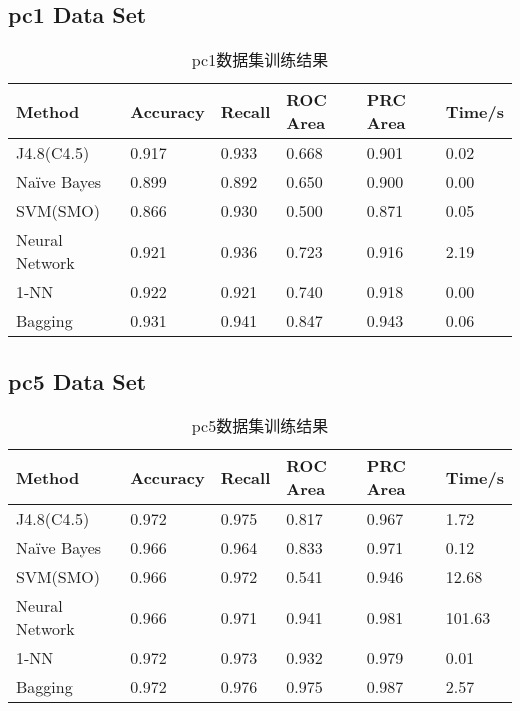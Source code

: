 \documentclass[a4paper,UTF8]{article}
\numberwithin{equation}{section}
\begin{document}
\subsection{pc1 Data Set}
\begin{table}[H]
\centering
\caption{pc1数据集训练结果}
\label{my-label}
\begin{tabular}{l|lllll}
\hline
Method         & Accuracy & Recall & ROC Area & PRC Area & Time/s \\ \hline
J4.8(C4.5)     & 0.917    & 0.933  & 0.668    & 0.901    & 0.02   \\ \hline
Naïve Bayes   & 0.899    & 0.892  & 0.650    & 0.900    & 0.00   \\ \hline
SVM(SMO)       & 0.866    & 0.930  & 0.500    & 0.871    & 0.05   \\ \hline
Neural Network & 0.921    & 0.936  & 0.723    & 0.916    & 2.19   \\ \hline
1-NN           & 0.922    & 0.921  & 0.740    & 0.918    & 0.00   \\ \hline
Bagging        & 0.931    & 0.941  & 0.847    & 0.943    & 0.06   \\ \hline
\end{tabular}
\end{table}

\subsection{pc5 Data Set}
\begin{table}[H]
\centering
\caption{pc5数据集训练结果}
\label{my-label}
\begin{tabular}{l|lllll}
\hline
Method         & Accuracy & Recall & ROC Area & PRC Area & Time/s \\ \hline
J4.8(C4.5)     & 0.972    & 0.975  & 0.817    & 0.967    & 1.72   \\ \hline
Naïve Bayes   & 0.966    & 0.964  & 0.833    & 0.971    & 0.12   \\ \hline
SVM(SMO)       & 0.966    & 0.972  & 0.541    & 0.946    & 12.68  \\ \hline
Neural Network & 0.966    & 0.971  & 0.941    & 0.981    & 101.63 \\ \hline
1-NN           & 0.972    & 0.973  & 0.932    & 0.979    & 0.01   \\ \hline
Bagging        & 0.972    & 0.976  & 0.975    & 0.987    & 2.57   \\ \hline
\end{tabular}
\end{table}
\end{document}
